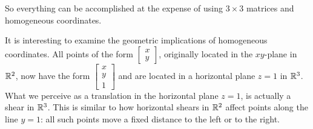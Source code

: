 \documentclass{ximera}
\begin{document}
So everything can be accomplished at the expense of using $3 \times 3$ matrices and homogeneous coordinates.

It is interesting to examine the geometric implications of homogeneous coordinates.  All points of the form $\begin{bmatrix}x\\y\end{bmatrix}$, originally located in the $xy$-plane in $\mathbb{R}^2$, now have the form $\begin{bmatrix}x\\y\\1\end{bmatrix}$ and are located in a horizontal plane $z=1$ in $\mathbb{R}^3$.  What we perceive as a translation in the horizontal plane $z=1$, is actually a shear in $\mathbb{R}^3$.  This is similar to how horizontal shears in $\mathbb{R}^2$ affect points along the line $y=1$: all such points move a fixed distance to the left or to the right. 
\end{document}

